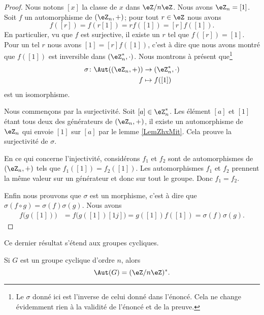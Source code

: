 \begin{proof}
    Nous notons \( [x]\) la classe de \( x\) dans \( \eZ/n\eZ\). Nous avons \( \eZ_n=[1]\). Soit \( f\) un automorphisme de \( (\eZ_n,+)\); pour tout \( r\in \eZ\) nous avons
    \begin{equation}
        f([r])=f(r[1])=rf([1])=[r]f([1]).
    \end{equation}
    En particulier, vu que \( f\) est surjective, il existe un \( r\) tel que \( f([r])=[1]\). Pour un tel \( r\) nous avons \( [1]=[r]f([1])\), c'est à dire que nous avons montré que \( f([1])\) est inversible dans \( (\eZ_n^*,\cdot)\). Nous montrons à présent que\footnote{Le \( \sigma\) donné ici est l'inverse de celui donné dans l'énoncé. Cela ne change évidemment rien à la validité de l'énoncé et de la preuve.}
    \begin{equation}
        \begin{aligned}
            \sigma\colon \Aut( (\eZ_n,+))&\to (\eZ_n^*,\cdot) \\
            f&\mapsto f([1]) 
        \end{aligned}
    \end{equation}
    est un isomorphisme.

    Nous commençons par la surjectivité. Soit \( [a]\in \eZ_n^*\). Les élément \( [a]\) et \( [1]\) étant tous deux des générateurs de \( (\eZ_n,+)\), il existe un automorphisme de \( \eZ_n\) qui envoie \( [1]\) sur \( [a]\) par le lemme \ref{LemZhxMit}. Cela prouve la surjectivité de \( \sigma\).

    En ce qui concerne l'injectivité, considérons \( f_1\) et \( f_2\) sont de automorphismes de \( (\eZ_n,+)\) tels que \( f_1([1])=f_2([1])\). Les automorphismes \( f_1\) et \( f_2\) prennent la même valeur sur un générateur et donc sur tout le groupe. Donc \( f_1=f_2\).

    Enfin nous prouvons que \( \sigma\) est un morphisme, c'est à dire que \( \sigma(f\circ g)=\sigma(f)\sigma(g)\). Nous avons
    \begin{subequations}
        \begin{align}
            f\big( g([1]) \big)&=f\big( g([1])[1j] \big)=g([1])f([1])=\sigma(f)\sigma(g).
        \end{align}
    \end{subequations}
\end{proof}

Ce dernier résultat s'étend aux groupes cycliques.
\begin{proposition}
    Si \( G\) est un groupe cyclique d'ordre \( n\), alors
    \begin{equation}
        \Aut(G)=(\eZ/n\eZ)^*.
    \end{equation}
\end{proposition}

